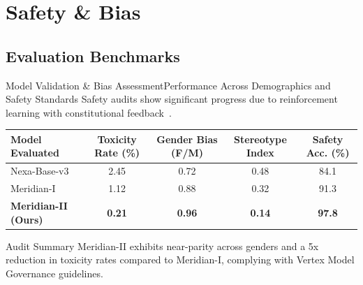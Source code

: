 \section{Safety \& Bias}
\subsection{Evaluation Benchmarks}

\begin{frame}{Model Validation \& Bias Assessment}{Performance Across Demographics and Safety Standards}
  Safety audits show significant progress due to reinforcement learning with constitutional feedback~\cite{thorne2025safety}.
  
  \vspace{0.2cm}
  \begin{table}[h]
    \centering
    \renewcommand{\arraystretch}{1.2}
    \small
    \begin{tabularx}{0.95\textwidth}{L C C C C}
      \toprule
      \textbf{Model Evaluated} & \textbf{Toxicity Rate (\%)} & \textbf{Gender Bias (F/M)} & \textbf{Stereotype Index} & \textbf{Safety Acc. (\%)} \\
      \midrule
      Nexa-Base-v3 & 2.45 & 0.72 & 0.48 & 84.1 \\
      Meridian-I & 1.12 & 0.88 & 0.32 & 91.3 \\
      \textbf{Meridian-II (Ours)} & \textbf{0.21} & \textbf{0.96} & \textbf{0.14} & \textbf{97.8} \\
      \bottomrule
    \end{tabularx}
  \end{table}
  
  \vspace{0.2cm}
  \begin{infobox}{Audit Summary}
    Meridian-II exhibits near-parity across genders and a 5x reduction in toxicity rates compared to Meridian-I, complying with Vertex Model Governance guidelines.
  \end{infobox}
\end{frame}
